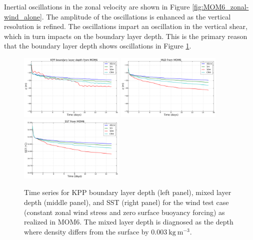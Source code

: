 Inertial oscillations in the zonal velocity are shown in Figure
\ref{fig:MOM6_zonal-wind_alone}.  The amplitude of the oscillations is
enhanced as the vertical resolution is refined.  The oscillations
impart an oscillation in the vertical shear, which in turn impacts on
the boundary layer depth.  This is the primary reason that the
boundary layer depth shows oscillations in Figure
\ref{fig:MOM6_SST_bldepth-wind_alone}.  

\begin{figure}[h!t]
\begin{center}
\includegraphics[angle=0,width=5cm]{./figs/MOM6/wind_only_KPP_MOM6_bldepth.png}
\includegraphics[angle=0,width=5cm]{./figs/MOM6/wind_only_KPP_MOM6_mld.png}
\includegraphics[angle=0,width=5cm]{./figs/MOM6/wind_only_KPP_MOM6_SST.png}
\caption[KPP BL depth, ML depth, and SST from MOM6 for
winds-alone]{\sf Time series for KPP boundary layer depth (left
  panel), mixed layer depth (middle panel), and SST (right panel) for
  the wind test case (constant zonal wind stress and zero surface
  buoyancy forcing) as realized in MOM6.  The mixed layer depth is
  diagnosed as the depth where density differs from the surface by
  $0.003~\mbox{kg}~\mbox{m}^{-3}.$}
\label{fig:MOM6_SST_bldepth-wind_alone}
\end{center}
\end{figure}


